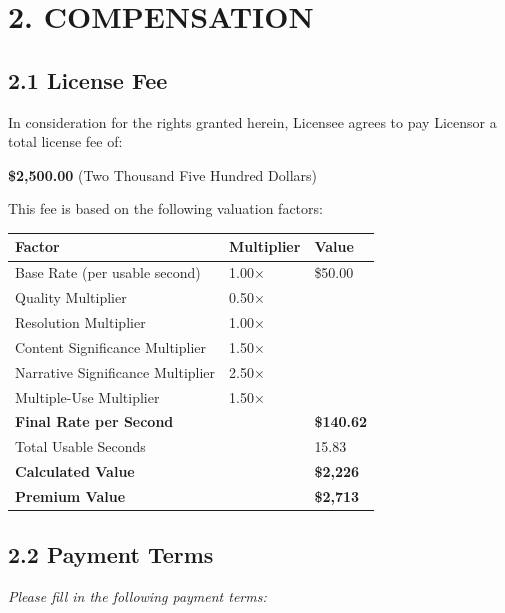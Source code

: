 \documentclass[
  11pt,
]{article}
\begin{document}
\hypertarget{compensation}{%
\section{2. COMPENSATION}\label{compensation}}

\hypertarget{license-fee}{%
\subsection{2.1 License Fee}\label{license-fee}}

In consideration for the rights granted herein, Licensee agrees to pay
Licensor a total license fee of:

\textbf{\$2,500.00} (Two Thousand Five Hundred Dollars)

This fee is based on the following valuation factors:

\begin{table}[h]
\centering
\begin{tabular}{L{5cm}L{2.5cm}L{6.5cm}}
\toprule
\textbf{Factor} & \textbf{Multiplier} & \textbf{Value} \\
\midrule
Base Rate (per usable second) & 1.00× & \$50.00 \\
Quality Multiplier & 0.50× & \\
Resolution Multiplier & 1.00× & \\
Content Significance Multiplier & 1.50× & \\
Narrative Significance Multiplier & 2.50× & \\
Multiple-Use Multiplier & 1.50× & \\
\textbf{Final Rate per Second} & & \textbf{\$140.62} \\
Total Usable Seconds & & 15.83 \\
\textbf{Calculated Value} & & \textbf{\$2,226} \\
\textbf{Premium Value} & & \textbf{\$2,713} \\
\bottomrule
\end{tabular}
\end{table}

\hypertarget{payment-terms}{%
\subsection{2.2 Payment Terms}\label{payment-terms}}

\emph{Please fill in the following payment terms:}
\end{document}
